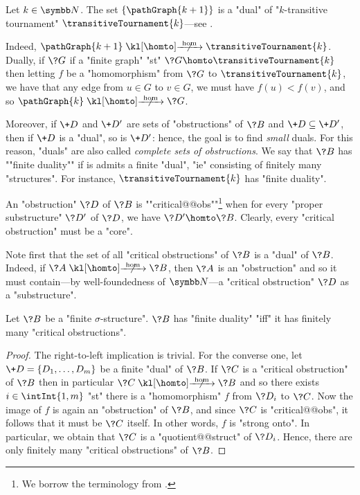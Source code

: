 \begin{example}
	\AP\label{ex:dual-T2} Let $k\in\N$. The set
	$\{\pathGraph{k+1}\}$ is a "dual" of 
	"$k$-transitive tournament" $\transitiveTournament{k}$---see .
	
	Indeed, $\pathGraph{k+1} \nothomto \transitiveTournament{k}$. Dually,
	if $\?G$ if a "finite graph" "st" $\?G \homto \transitiveTournament{k}$ then
	letting $f$ be a "homomorphism" from $\?G$ to $\transitiveTournament{k}$,
	we have that any edge from $u \in G$ to $v \in G$, we must have $f(u) < f(v)$,
	and so $\pathGraph{k} \nothomto \?G$.
\end{example}

Moreover, if $\+D$ and $\+D'$ are sets of "obstructions" of $\?B$ and $\+D \subseteq \+D'$,
then if $\+D$ is a "dual", so is $\+D'$: hence, the goal is to find \emph{small} duals.
For this reason, "duals" are also called \emph{complete sets of obstructions}.
We say that $\?B$ has \AP""finite duality"" if is admits a finite "dual", "ie"
consisting of finitely many "structures". For instance, $\transitiveTournament{k}$ has "finite duality".

An "obstruction" $\?D$ of $\?B$ is \AP""critical@@obs""\footnote{We borrow the terminology
from \cite{LaroseLotenTardif2007CharacterisationFOCSP}.} when for every
"proper substructure" $\?D'$ of $\?D$, we have $\?D' \homto \?B$.
Clearly, every "critical obstruction" must be a "core".

Note first that the set of all "critical obstructions" of $\?B$ is a "dual" of $\?B$.
Indeed, if $\?A \nothomto \?B$, then $\?A$ is an "obstruction" and so it must contain---by well-foundedness of $\N$---a "critical obstruction" $\?D$ as a "substructure".

\begin{proposition}
	\label{prop:finite-duality-iff-critical-obstructions}
	Let $\?B$ be a "finite $\sigma$-structure". $\?B$ has "finite duality"
	"iff" it has finitely many "critical obstructions".
\end{proposition}

\begin{proof}
	The right-to-left implication is trivial. For the converse one,
	let $\+D = \{D_1,\dotsc,D_m\}$ be a finite "dual" of $\?B$.
	If $\?C$ is a "critical obstruction" of $\?B$ then in particular $\?C \nothomto \?B$
	and so there exists $i \in \intInt{1,m}$ "st" there is a "homomorphism" $f$ 
	from $\?D_i$ to $\?C$. Now the image of $f$ is again an "obstruction" of $\?B$,
	and since $\?C$ is "critical@@obs", it follows that it must be $\?C$ itself. In other
	words, $f$ is "strong onto". In particular, we obtain that $\?C$ is a "quotient@@struct" of
	$\?D_i$. Hence, there are only finitely many "critical obstructions" of $\?B$.
\end{proof}

